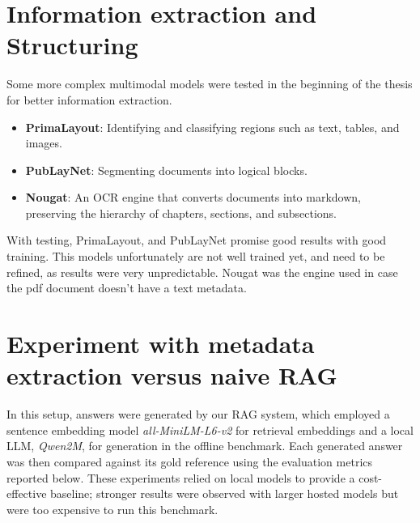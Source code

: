 \label{chapter:Results}

\section{Information extraction and Structuring}
Some more complex multimodal models were tested in the beginning of the thesis for better information extraction.
\begin{itemize}
    \item \textbf{PrimaLayout}: Identifying and classifying regions such as text, tables, and images.
    \item \textbf{PubLayNet}: Segmenting documents into logical blocks.
    \item \textbf{Nougat}: An OCR engine that converts documents into markdown, preserving the hierarchy of chapters, sections, and subsections.
\end{itemize}
With testing, PrimaLayout, and PubLayNet promise good results with good training. This models unfortunately are not well trained yet, and need to be refined, as results were very unpredictable. Nougat was the engine used in case the pdf document doesn't have a text metadata.

\section{Experiment with metadata extraction versus naive RAG}
In this setup, answers were generated by our RAG system, which employed a sentence embedding model \textit{all-MiniLM-L6-v2} for retrieval embeddings and a local \ac{LLM}, \textit{Qwen2M}, for generation in the offline benchmark. 
Each generated answer was then compared against its gold reference using the evaluation metrics reported below. 
These experiments relied on local models to provide a cost-effective baseline; stronger results were observed with larger hosted models but were too expensive to run this benchmark.

